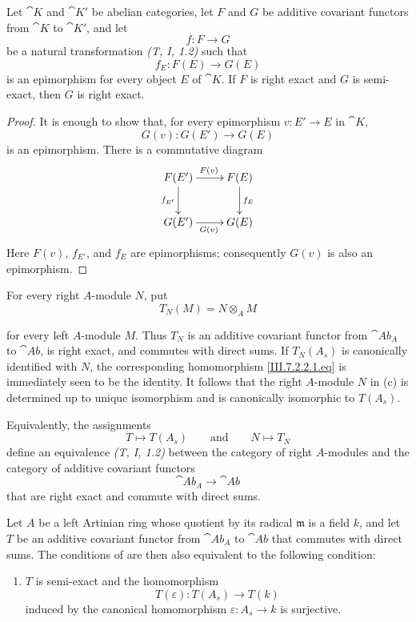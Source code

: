 \begin{lemma}[7.2.5.1]
\label{III.7.2.5.1}
Let $\cat{K}$ and $\cat{K}'$ be abelian categories, let $F$ and
$G$ be additive covariant functors from $\cat{K}$ to
$\cat{K}'$, and let
\[
  f:F\longrightarrow G
\]
be a natural transformation \emph{(T, I, 1.2)} such that
\[
  f_E:F(E)\longrightarrow G(E)
\]
is an epimorphism for every object $E$ of $\cat{K}$.  If $F$ is
right exact and $G$ is semi-exact, then $G$ is right exact.
\end{lemma}

\begin{proof}
It is enough to show that, for every epimorphism
$v:E'\to E$ in $\cat{K}$,
\[
  G(v):G(E')\longrightarrow G(E)
\]
is an epimorphism.  There is a commutative diagram
\[
\xymatrix{
  F(E')\ar[r]^{F(v)}\ar[d]_{f_{E'}}
  & F(E)\ar[d]^{f_E}
  \\
  G(E')\ar[r]_{G(v)}
  & G(E)
}
\]
Here $F(v)$, $f_{E'}$, and $f_E$ are epimorphisms; consequently
$G(v)$ is also an epimorphism.
\end{proof}

\begin{remark}[7.2.6]
\label{III.7.2.6}
For every right $A$-module $N$, put
\[
  T_N(M)=N\otimes_A M
\]
\par\medskip\noindent
for every left $A$-module $M$.  Thus $T_N$ is an additive
covariant functor from $\cat{Ab}_A$ to $\cat{Ab}$, is right
exact, and commutes with direct sums.  If $T_N(A_s)$ is
canonically identified with $N$, the corresponding homomorphism
\eqref{III.7.2.2.1.eq} is immediately seen to be the identity.
It follows that the right $A$-module $N$ in
(c) is determined up to unique isomorphism and
is canonically isomorphic to $T(A_s)$.

Equivalently, the assignments
\[
  T\longmapsto T(A_s)
  \qquad\text{and}\qquad
  N\longmapsto T_N
\]
define an equivalence \emph{(T, I, 1.2)} between the category
of right $A$-modules and the category of additive covariant
functors
\[
  \cat{Ab}_A\longrightarrow\cat{Ab}
\]
that are right exact and commute with direct sums.
\end{remark}

\begin{proposition}[7.2.7]
\label{III.7.2.7}
Let $A$ be a left Artinian ring whose quotient by its radical
$\mathfrak m$ is a field $k$, and let $T$ be an additive
covariant functor from $\cat{Ab}_A$ to $\cat{Ab}$ that commutes
with direct sums.  The conditions of  are then
also equivalent to the following condition:
\begin{enumerate}
  \item[(d)] $T$ is semi-exact and the homomorphism
    \[
      T(\varepsilon):T(A_s)\longrightarrow T(k)
    \]
    induced by the canonical homomorphism
    $\varepsilon:A_s\to k$ is surjective.
\end{enumerate}
\end{proposition}

